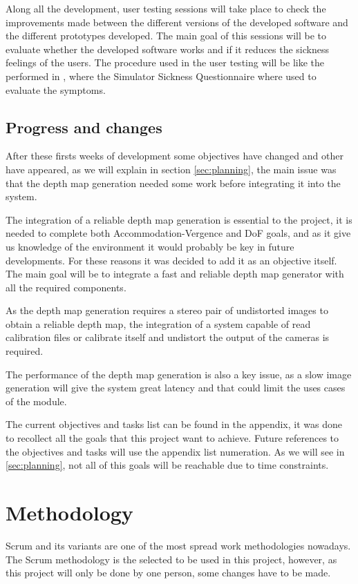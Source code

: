 \documentclass[10pt,a4paper,twocolumn,twoside]{article}
\begin{document}
	Along all the development, user testing sessions will take place to check the improvements made between the different versions of the developed software and the different prototypes developed. The main goal of this sessions will be to evaluate whether the developed software works and if it reduces the sickness feelings of the users. The procedure used in the user testing will be like the performed in \cite{ifftConfortDoF}, where the Simulator Sickness Questionnaire \cite{ssqQuestion} where used to evaluate the symptoms. 
	
	\subsection{Progress and changes}
	
	After these firsts weeks of development some objectives have changed and other have appeared, as we will explain in section \ref{sec:planning}, the main issue was that the depth map generation needed some work before integrating it into the system.
	
	The integration of a reliable depth map generation is essential to the project, it is needed to complete both Accommodation-Vergence and DoF goals, and as it give us knowledge of the environment it would probably be key in future developments. For these reasons it was decided to add it as an objective itself. The main goal will be to integrate a fast and reliable depth map generator with all the required components.
	
	As the depth map generation requires a stereo pair of undistorted images to obtain a reliable depth map, the integration of a system capable of read calibration files or calibrate itself and undistort the output of the cameras is required.  

	The performance of the depth map generation is also a key issue, as a slow image generation will give the system great latency and that could limit the uses cases of the module. 
	
	The current objectives and tasks list can be found in the appendix, it was done to recollect all the goals that this project want to achieve. Future references to the objectives and tasks will use the appendix list numeration. As we will see in \ref{sec:planning}, not all of this goals will be reachable due to time constraints.
	
	\section{Methodology}
	Scrum and its variants are one of the most spread work methodologies nowadays.
	The Scrum methodology is the selected to be used in this project, however, as this project will only be done by one person, some changes have to be made. 
	
\end{document}
